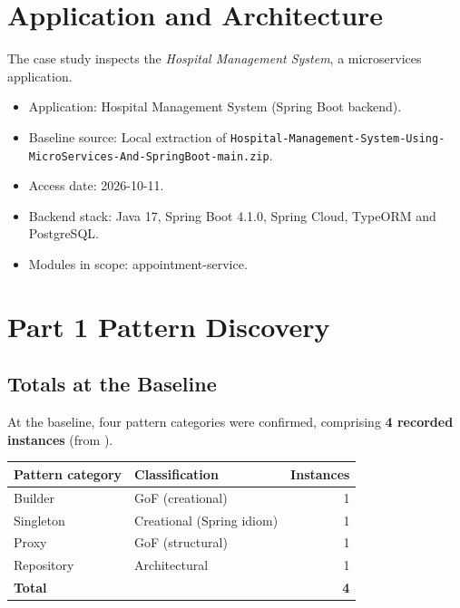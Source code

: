 \documentclass[11pt,a4paper]{article}
\begin{document}
\section{Application and Architecture}
The case study inspects the \emph{Hospital Management System}, a microservices application.
\begin{itemize}
  \item Application: Hospital Management System (Spring Boot backend).
  \item Baseline source: Local extraction of \texttt{Hospital-Management-System-Using-MicroServices-And-SpringBoot-main.zip}.
  \item Access date: 2026-10-11.
  \item Backend stack: Java 17, Spring Boot 4.1.0, Spring Cloud, TypeORM and PostgreSQL.
  \item Modules in scope: appointment-service.
\end{itemize}

\section{Part 1 Pattern Discovery}
\subsection{Totals at the Baseline}
At the baseline, four pattern categories were confirmed, comprising \textbf{4 recorded instances} (from ).

\begin{center}
\begin{tabular}{l l r}
\toprule
Pattern category & Classification & Instances \\
\midrule
Builder & GoF (creational) & 1 \\
Singleton & Creational (Spring idiom) & 1 \\
Proxy & GoF (structural) & 1 \\
Repository & Architectural & 1 \\
\midrule
\textbf{Total} & & \textbf{4} \\
\bottomrule
\end{tabular}
\end{center}
\end{document}
